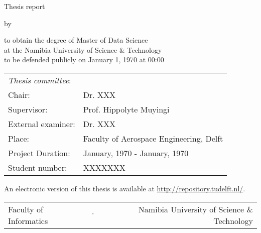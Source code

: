 \begin{titlepage}

\begin{center}

{\makeatletter
\largetitlestyle\fontsize{45}{45}\selectfont\@title
\makeatother}

\bigskip

{\makeatletter
\vspace{12mm}
\ifdefvoid{\@subtitle}{}{\largetitlestyle\fontsize{20}{20}\selectfont\@subtitle}
\makeatother}

\bigskip
\bigskip

Thesis report

\bigskip
\bigskip

by

\bigskip
\bigskip

{\makeatletter
\largetitlestyle\fontsize{25}{25}\selectfont\@author
\makeatother}

\bigskip
\bigskip

to obtain the degree of Master of Data Science \\
at the Namibia University of Science \& Technology \\
to be defended publicly on January 1, 1970 at 00:00

\vfill

\begin{tabular}{ll}
\textit{Thesis committee}:      & \\
Chair:                          & Dr. XXX \\ 
Supervisor:                    & Prof. Hippolyte Muyingi \\
External examiner:              & Dr. XXX \\ 
Place:                          & Faculty of Aerospace Engineering, Delft \\
Project Duration: & January, 1970 - January, 1970 \\
Student number: & XXXXXXX
\end{tabular}

\vspace*{1cm}

An electronic version of this thesis is available at \url{http://repository.tudelft.nl/}.

\vspace*{2cm}
  \begin{center}
    \begin{tabular}{lcr}
      Faculty of Informatics & $\cdot$ & Namibia University of Science \& Technology
    \end{tabular}
  \end{center}

\end{center}

\end{titlepage}
